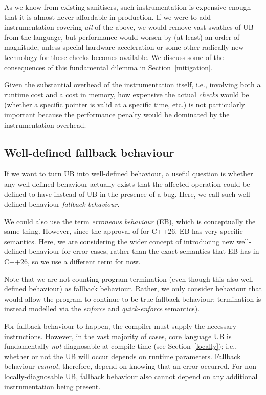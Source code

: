 {As we know from existing sanitisers, such instrumentation is expensive enough that it is almost never affordable in production. If we were to add instrumentation covering \emph{all} of the above, we would remove vast swathes of UB from the language, but performance would worsen by (at least) an order of magnitude, unless special hardware-acceleration or some other radically new technology for these checks becomes available. We discuss some of the consequences of this fundamental dilemma in Section~\ref{mitigation}.

Given the substantial overhead of the instrumentation itself, i.e., involving both a runtime cost and a cost in memory, how expensive the actual \emph{checks} would be (whether a specific pointer is valid at a specific time, etc.) is not particularly important because the performance penalty would be dominated by the instrumentation overhead.

\subsection{Well-defined fallback behaviour}
\label{fallback}

If we want to turn UB into well-defined behaviour, a useful question is whether any well-defined behaviour actually exists that the affected operation could be defined to have instead of UB in the presence of a bug. Here, we call such well-defined behaviour \emph{fallback behaviour}. 

We could also use the term \emph{erroneous behaviour} (EB), which is conceptually the same thing. However, since the approval of \cite{P2795R5} for C++26, EB has very specific semantics. Here, we are considering the wider concept of introducing new well-defined behaviour for error cases, rather than the exact semantics that EB has in C++26, so we use a different term for now.

Note that we are not counting program termination (even though this also well-defined behaviour) as fallback behaviour. Rather, we only consider behaviour that would allow the program to continue to be true fallback behaviour; termination is instead modelled via the \emph{enforce} and \emph{quick-enforce} semantics).

For fallback behaviour to happen, the compiler must supply the necessary instructions. However, in the vast majority of cases, core language UB is fundamentally \emph{not} diagnosable at compile time (see Section~\ref{locally}); i.e., whether or not the UB will occur depends on runtime parameters. Fallback behaviour \emph{cannot}, therefore, depend on knowing that an error occurred. For non-locally-diagnosable UB, fallback behaviour also cannot depend on any additional instrumentation being present.

}
